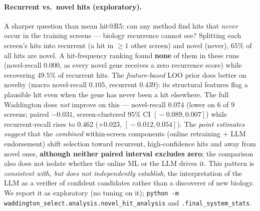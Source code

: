 \documentclass[11pt]{article}
\begin{document}
\paragraph{Recurrent vs.\ novel hits (exploratory).} A sharper question than mean hit@R5: can any method
find hits that \emph{never} occur in the training screens --- biology recurrence cannot see? Splitting each
screen's hits into recurrent (a hit in $\ge\!1$ other screen) and novel (never), $65\%$ of all hits are
novel. A hit-frequency ranking found \textbf{none} of them in these runs (novel-recall $0.000$, as every
novel gene receives a zero recurrence score) while recovering $49.5\%$ of recurrent hits. The
\emph{feature-based} LOO prior does better on novelty (macro novel-recall $\mathbf{0.105}$, recurrent
$0.439$): its structural features flag a plausible hit even when the gene has never been a hit elsewhere.
The full Waddington does \emph{not} improve on this --- novel-recall $0.074$ (lower on 6 of 9 screens;
paired $-0.031$, screen-clustered $95\%$ CI $[\!-\!0.089, 0.007]$) while recurrent-recall rises to $0.462$
($+0.023$, $[\!-\!0.012, 0.054]$). The \emph{point estimates suggest} that the \emph{combined} within-screen
components (online retraining $+$ LLM endorsement) shift selection toward recurrent, high-confidence hits
and away from novel ones, \textbf{although neither paired interval excludes zero}; the comparison also does
not isolate whether the online ML or the LLM drives it. This pattern is \emph{consistent with, but does not
independently establish}, the interpretation of the LLM as a verifier of confident candidates rather than a
discoverer of new biology. We report it as exploratory (no tuning on it);
\texttt{python -m waddington\_select.analysis.novel\_hit\_analysis} and \texttt{.final\_system\_stats}.
\end{document}
